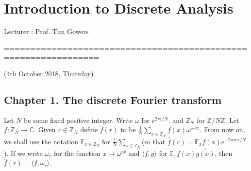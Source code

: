 \documentclass[10pt,a4paper]{report}
\renewcommand{\hat}{\widehat}
\begin{document}
\newcommand{\thm}{\textbf{Theorem) }}
\newcommand{\thmnum}[1]{\textbf{Theorem #1) }}
\newcommand{\defi}{\textbf{Definition) }}
\newcommand{\lem}{\textbf{Lemma) }}
\newcommand{\lemnum}[1]{\textbf{Lemma #1) }}
\newcommand{\prop}{\textbf{Proposition) }}
\newcommand{\propnum}[1]{\textbf{Proposition #1) }}
\newcommand{\cor}{\textbf{Corollary) }}
\newcommand{\cornum}[1]{\textbf{Corollary #1) }}


\newcommand{\pf}{\textbf{proof) }}
\newcommand{\eop}{\hfill  \textsl{(End of proof)} $\square$} %


\newcommand{\lap}{\triangle} %
\newcommand{\s}{\vspace{10pt}}
\newcommand{\bull}{$\bullet$}
\newcommand{\sta}{$\star$}
\newcommand{\reals}{\mathbb{R}}

\newcommand{\intN}{\mathbb{Z}_N}
\newcommand{\norms}[2]{\parallel #1 \parallel_{#2}}
\newcommand{\avg}{\mathbb{E}}
\newcommand{\prob}{\mathbb{P}}
\newcommand{\osc}{\text{\osc}}

\newcommand{\newday}{================================================================}
\newcommand{\digression}{**********************************************************************************************}

\renewcommand{\bar}{\overline}

\setlength\parindent{0pt}

\chapter*{Introduction to Discrete Analysis}
\s

Lecturer : Prof. Tim Gowers
\s

\newday

(4th October 2018, Thursday)
\s

\section*{Chapter 1. The discrete Fourier transform}
\s

Let $N$ be some fixed positive integer. Write $\omega$ for $e^{2\pi i /N}$. and $\mathbb{Z}_N$ for $\mathbb{Z}/N\mathbb{Z}$. Let $f: \mathbb{Z}_N \rightarrow \mathbb{C}$. Given $r \in \mathbb{Z}_N$ define $\hat{f}(r)$ to be $\frac{1}{N} \sum_{x \in \mathbb{Z}_N} f(x) \omega^{-rx}$. From now on, we shall use the notation $\mathbb{E}_{x\in \mathbb{Z}_N}$ for $\frac{1}{N} \sum_{x \in \mathbb{Z}_N}$(so that $\hat{f}(r)  = \mathbb{E}_x f(x)e^{-2\pi i rx/N}$). If we write $\omega_r$ for the function $x\mapsto \omega^{rx}$ and $\langle f,g \rangle$ for $\mathbb{E}_x f(x)\bar{g(x)}$, then $\hat{f}(r) = \langle f,\omega_r \rangle$.
\s
\end{document}
